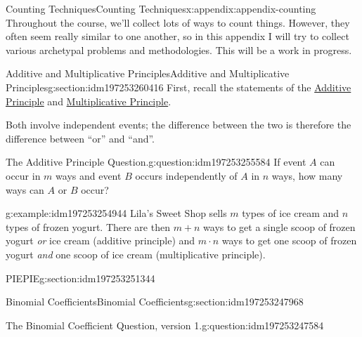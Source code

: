 \documentclass[oneside,10pt,]{book}
\numberwithin{equation}{section}
\begin{document}
\begin{appendixptx}{Counting Techniques}{}{Counting Techniques}{}{}{x:appendix:appendix-counting}
Throughout the course, we'll collect lots of ways to count things. However, they often seem really similar to one another, so in this appendix I will try to collect various archetypal problems and methodologies. This will be a work in progress.%
%
%
\typeout{************************************************}
\typeout{************************************************}
%
\begin{sectionptx}{Additive and Multiplicative Principles}{}{Additive and Multiplicative Principles}{}{}{g:section:idm197253260416}
First, recall the statements of the \hyperref[x:assemblage:additive-principle]{Additive Principle} and \hyperref[x:assemblage:multiplicative-principle]{Multiplicative Principle}.%
\par
Both involve independent events; the difference between the two is therefore the difference between ``or'' and ``and''.%
\begin{question}{The Additive Principle Question.}{g:question:idm197253255584}%
If event \(A\) can occur in \(m\) ways and event \(B\) occurs independently of \(A\) in \(n\) ways, how many ways can \(A\) or \(B\) occur?%
\end{question}
\begin{example}{}{g:example:idm197253254944}%
Lila's Sweet Shop sells \(m\) types of ice cream and \(n\) types of frozen yogurt. There are then \(m+n\) ways to get a single scoop of frozen yogurt \emph{or} ice cream (additive principle) and \(m\cdot n\) ways to get one scoop of frozen yogurt \emph{and} one scoop of ice cream (multiplicative principle).%
\end{example}
\end{sectionptx}
%
%
\typeout{************************************************}
\typeout{************************************************}
%
\begin{sectionptx}{PIE}{}{PIE}{}{}{g:section:idm197253251344}
\end{sectionptx}
%
%
\typeout{************************************************}
\typeout{************************************************}
%
\begin{sectionptx}{Binomial Coefficients}{}{Binomial Coefficients}{}{}{g:section:idm197253247968}
\begin{question}{The Binomial Coefficient Question, version 1.}{g:question:idm197253247584}%

\end{question}
\end{sectionptx}
\end{appendixptx}
\end{document}
